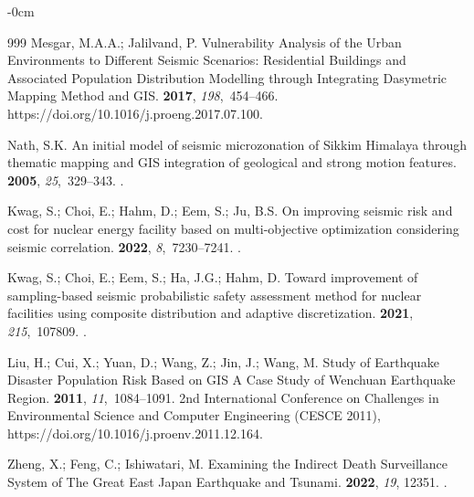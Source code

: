 \documentclass[sustainability,article,accept,pdftex,moreauthors]{Definitions/mdpi}
\begin{document}
\begin{adjustwidth}{-\extralength}{0cm}
\begin{thebibliography}{999}
Mesgar, M.A.A.; Jalilvand, P.
\newblock Vulnerability Analysis of the Urban Environments to Different Seismic
  Scenarios: Residential Buildings and Associated Population Distribution
  Modelling through Integrating Dasymetric Mapping Method and GIS.
 {\bf 2017}, {\em 198},~454--466.
\newblock 
  {{https://doi.org/10.1016/j.proeng.2017.07.100}}.

Nath, S.K.
\newblock An initial model of seismic microzonation of Sikkim Himalaya through
  thematic mapping and GIS integration of geological and strong motion
  features.
 {\bf 2005}, {\em 25},~329--343.
.

Kwag, S.; Choi, E.; Hahm, D.; Eem, S.; Ju, B.S.
\newblock On improving seismic risk and cost for nuclear energy facility based
  on multi-objective optimization considering seismic correlation.
 {\bf 2022}, {\em 8},~7230--7241.
.

Kwag, S.; Choi, E.; Eem, S.; Ha, J.G.; Hahm, D.
\newblock Toward improvement of sampling-based seismic probabilistic safety
  assessment method for nuclear facilities using composite distribution and
  adaptive discretization.
 {\bf 2021}, {\em
  215},~107809.
.

Liu, H.; Cui, X.; Yuan, D.; Wang, Z.; Jin, J.; Wang, M.
\newblock Study of Earthquake Disaster Population Risk Based on GIS A Case
  Study of Wenchuan Earthquake Region.
 {\bf 2011}, {\em
  11},~1084--1091.
 2nd International Conference on Challenges in Environmental
  Science and Computer Engineering (CESCE 2011),
  {{https://doi.org/10.1016/j.proenv.2011.12.164}}.

Zheng, X.; Feng, C.; Ishiwatari, M.
\newblock Examining the Indirect Death Surveillance System of The Great East
  Japan Earthquake and Tsunami.
 {\bf 2022}, {\em 19}, 12351.
.


\end{thebibliography}
\end{adjustwidth}
\end{document}
